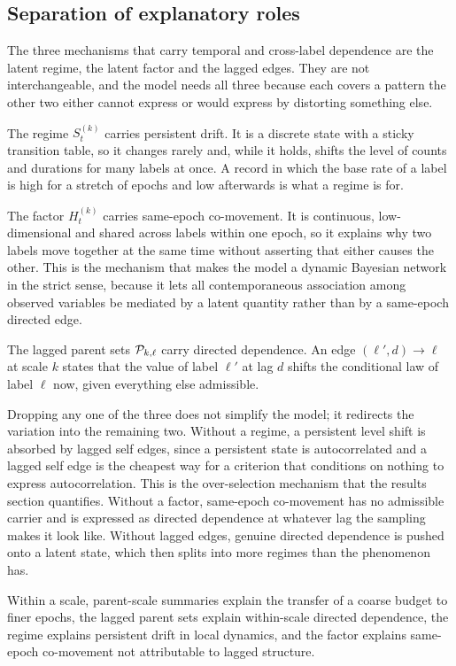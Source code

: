 \subsection{Separation of explanatory roles}
\label{sec:role_separation}

The three mechanisms that carry temporal and cross-label dependence are the
latent regime, the latent factor and the lagged edges. They are not
interchangeable, and the model needs all three because each covers a pattern
the other two either cannot express or would express by distorting something
else.

The regime $S_t^{(k)}$ carries persistent drift. It is a discrete state with a
sticky transition table, so it changes rarely and, while it holds, shifts the
level of counts and durations for many labels at once. A record in which the
base rate of a label is high for a stretch of epochs and low afterwards is what
a regime is for.

The factor $H_t^{(k)}$ carries same-epoch co-movement. It is continuous,
low-dimensional and shared across labels within one epoch, so it explains why
two labels move together at the same time without asserting that either causes
the other. This is the mechanism that makes the model a dynamic Bayesian
network in the strict sense, because it lets all contemporaneous association
among observed variables be mediated by a latent quantity rather than by a
same-epoch directed edge.

The lagged parent sets ${\mathcal{P}}_{k,\ell}$ carry directed dependence. An edge
$(\ell',d) \to \ell$ at scale $k$ states that the value of label $\ell'$ at lag
$d$ shifts the conditional law of label $\ell$ now, given everything else
admissible.

Dropping any one of the three does not simplify the model; it redirects the
variation into the remaining two. Without a regime, a persistent level shift is
absorbed by lagged self edges, since a persistent state is autocorrelated and a
lagged self edge is the cheapest way for a criterion that conditions on nothing
to express autocorrelation. This is the over-selection mechanism that the
results section quantifies. Without a factor, same-epoch co-movement has no
admissible carrier and is expressed as directed dependence at whatever lag the
sampling makes it look like. Without lagged edges, genuine directed dependence
is pushed onto a latent state, which then splits into more regimes than the
phenomenon has.

\begin{assumption}
\label{assm:role_separation}
Within a scale, parent-scale summaries explain the transfer of a coarse budget
to finer epochs, the lagged parent sets explain within-scale directed
dependence, the regime explains persistent drift in local dynamics, and the
factor explains same-epoch co-movement not attributable to lagged structure.
\end{assumption}

